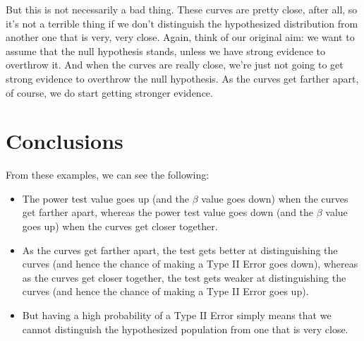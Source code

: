 \documentclass[../../../main.tex]{subfiles}
\begin{document}
But this is not necessarily a bad thing. These curves are pretty close, after all, so it's not a terrible thing if we don't distinguish the hypothesized distribution from another one that is very, very close. Again, think of our original aim: we want to assume that the null hypothesis stands, unless we have strong evidence to overthrow it. And when the curves are really close, we're just not going to get strong evidence to overthrow the null hypothesis. As the curves get farther apart, of course, we do start getting stronger evidence.


\section{Conclusions}

From these examples, we can see the following:

\begin{itemize}

  \item The power test value goes up (and the $\beta$ value goes down) when the curves get farther apart, whereas the power test value goes down (and the $\beta$ value goes up) when the curves get closer together.

  \item As the curves get farther apart, the test gets better at distinguishing the curves (and hence the chance of making a Type II Error goes down), whereas as the curves get closer together, the test gets weaker at distinguishing the curves (and hence the chance of making a Type II Error goes up). 

  \item But having a high probability of a Type II Error simply means that we cannot distinguish the hypothesized population from one that is very close.

\end{itemize}
\end{document}
